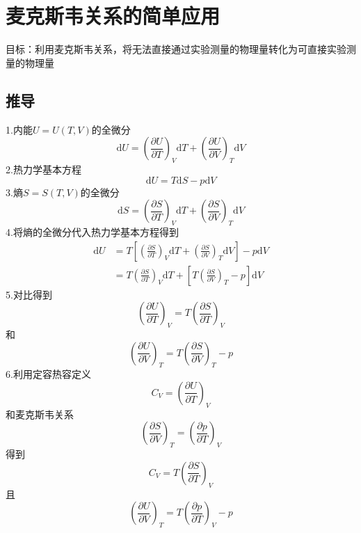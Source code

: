 \section{麦克斯韦关系的简单应用}

目标：利用麦克斯韦关系，将无法直接通过实验测量的物理量转化为可直接实验测量的物理量

\newpage
\subsection{推导}
1.内能$U=U(T,V)$的全微分
\begin{equation}
    \mathrm{d}U=\left( \frac{\partial U}{\partial T} \right) _V\mathrm{d}T+\left( \frac{\partial U}{\partial V} \right) _T\mathrm{d}V
\end{equation}
2.热力学基本方程
\begin{equation}
    \mathrm{d}U=T\mathrm{d}S-p\mathrm{d}V
\end{equation}
3.熵$S=S(T,V)$的全微分
\begin{equation}
    \mathrm{d}S=\left( \frac{\partial S}{\partial T} \right) _V\mathrm{d}T+\left( \frac{\partial S}{\partial V} \right) _T\mathrm{d}V
\end{equation}
4.将熵的全微分代入热力学基本方程得到
\begin{equation}
    \begin{aligned}
        \mathrm{d}U&=T\left[ \left( \frac{\partial S}{\partial T} \right) _V\mathrm{d}T+\left( \frac{\partial S}{\partial V} \right) _T\mathrm{d}V \right] -p\mathrm{d}V
\\
&=T\left( \frac{\partial S}{\partial T} \right) _V\mathrm{d}T+\left[ T\left( \frac{\partial S}{\partial V} \right) _T-p \right] \mathrm{d}V
    \end{aligned}
\end{equation}
5.对比得到
\begin{equation}
    \left( \frac{\partial U}{\partial T} \right) _V=T\left( \frac{\partial S}{\partial T} \right) _V
\end{equation}
和
\begin{equation}
    \left( \frac{\partial U}{\partial V} \right) _T=T\left( \frac{\partial S}{\partial V} \right) _T-p
\end{equation}
6.利用定容热容定义
\begin{equation}
    C_V=\left( \frac{\partial U}{\partial T} \right) _V
\end{equation}
和麦克斯韦关系
\begin{equation}
    \left( \frac{\partial S}{\partial V} \right) _T=\left( \frac{\partial p}{\partial T} \right) _V
\end{equation}
得到
\begin{equation}
    C_V=T\left( \frac{\partial S}{\partial T} \right) _V
\end{equation}
且
\begin{equation}
    \left( \frac{\partial U}{\partial V} \right) _T=T\left( \frac{\partial p}{\partial T} \right) _V-p
\end{equation}



